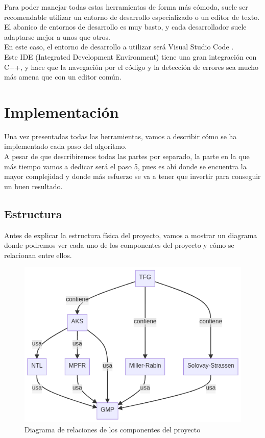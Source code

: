 Para poder manejar todas estas herramientas de forma más cómoda, suele ser recomendable utilizar un entorno de desarrollo especializado o un editor de texto.\\

El abanico de entornos de desarrollo es muy basto, y cada desarrollador suele adaptarse mejor a unos que otros.\\

En este caso, el entorno de desarrollo a utilizar será Visual Studio Code \cite{vscode}.\\

Este IDE (Integrated Development Environment) tiene una gran integración con C++, y hace que la navegación por el código y la detección de errores sea mucho más amena que con un editor común.

\section{Implementación}

Una vez presentadas todas las herramientas, vamos a describir cómo se ha implementado cada paso del algoritmo.\\

A pesar de que describiremos todas las partes por separado, la parte en la que más tiempo vamos a dedicar será el paso 5, pues es ahí donde se encuentra la mayor complejidad y donde más esfuerzo se va a tener que invertir para conseguir un buen resultado.

\subsection{Estructura}

Antes de explicar la estructura física del proyecto, vamos a mostrar un diagrama donde podremos ver cada uno de los componentes del proyecto y cómo se relacionan entre ellos.

\begin{figure}[H]
	\centering
	\includegraphics[totalheight=12cm]{img/diagrama-relaciones}
	\caption{Diagrama de relaciones de los componentes del proyecto}
\end{figure}

